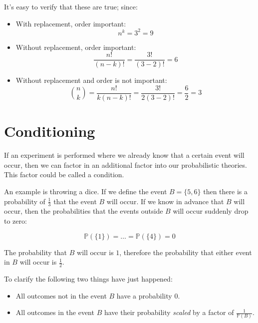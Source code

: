 It's easy to verify that these are true; since:

\begin{itemize}
	\item With replacement, order important:
	\begin{dmath*}
		n^k = 3^2 = 9
	\end{dmath*}
	\item Without replacement, order important:
	\begin{dmath*}
		\frac{n!}{(n - k)!} = 	\frac{3!}{(3 - 2)!} = 6
	\end{dmath*}
	\item Without replacement and order is not important:
	\begin{dmath*}
		{n \choose k} = \frac{n!}{k(n - k)!} = \frac{3!}{2(3 - 2)!} = \frac{6}{2} = 3
	\end{dmath*}

\end{itemize}



\section{Conditioning}

If an experiment is performed where we already know that a certain event will
occur, then we can factor in an additional factor into our probabilistic
theories. This factor could be called a condition.

An example is throwing a dice. If we define the event $B = \{5, 6\}$ then there
is a probability of $\frac{1}{3}$ that the event $B$ will occur. If we know in
advance that $B$ will occur, then the probabilities that the events outside $B$
will occur suddenly drop to zero:

\begin{dmath*}
	{\mathbb{P}(\{1\}) = \dots = \mathbb{P}(\{4\}) = 0}
\end{dmath*}

The probability that $B$ will occur is $1$, therefore the probability that
either event in $B$ will occur is $\frac{1}{2}$.

To clarify the following two things have just happened:

\begin{itemize}
	\item All outcomes not in the event $B$ have a probability $0$.
	\item All outcomes in the event $B$ have their probability {\it scaled} by a
	factor of $\frac{1}{\mathbb{P}(B)}$.
\end{itemize}

